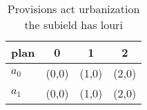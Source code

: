 \documentclass[a4paper]{article}
\begin{document}
\begin{table}
\begin{adjustbox}{width=0.5\columnwidth}
\begin{tabular}{|l|l|l|l|}
\hline
\textbf{plan} & \multicolumn{1}{c|}{\textbf{0}} & \multicolumn{1}{c|}{\textbf{1}} & \multicolumn{1}{c|}{\textbf{2}} \\ \hline
\textbf{$a_0$}  & (0,0) & (1,0) & (2,0) \\ \hline
\textbf{$a_1$}  & (0,0) & (1,0) & (2,0) \\ \hline
\end{tabular}
\end{adjustbox}
\caption{Provisions act urbanization the subield has louri
}
\end{table}
\end{document}
